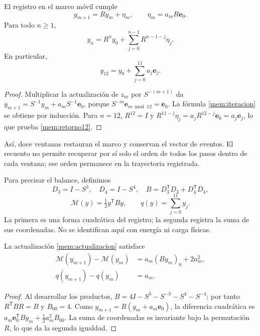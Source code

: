\begin{proposition}
\label{mem:prop-actualizacion}
El registro en el marco móvil cumple
\begin{equation}
 y_{m+1}=Ry_m+\eta_m,\qquad
 \eta_m=a_mR\mathbf e_0.
 \label{mem:actualizacion}
\end{equation}
Para todo \(n\geq1\),
\begin{equation}
 y_n=R^ny_0+\sum_{j=0}^{n-1}R^{n-1-j}\eta_j.
 \label{mem:iteracion}
\end{equation}
En particular,
\begin{equation}
 y_{12}=y_0+\sum_{j=0}^{11}a_j\mathbf e_j.
 \label{mem:retorno12}
\end{equation}
\end{proposition}
\begin{proof}
Multiplicar la actualización de \(z_m\) por \(S^{-(m+1)}\) da
\(y_{m+1}=S^{-1}y_m+a_mS^{-1}\mathbf e_0\), porque
\(S^{-m}\mathbf e_{m\bmod12}=\mathbf e_0\).
La fórmula \eqref{mem:iteracion} se obtiene por inducción.
Para \(n=12\), \(R^{12}=I\) y
\(R^{11-j}\eta_j=a_jR^{12-j}\mathbf e_0=a_j\mathbf e_j\),
lo que prueba \eqref{mem:retorno12}.
\end{proof}

Así, doce ventanas restauran el marco y conservan el vector de eventos.
El recuento no permite recuperar por sí solo el orden de todos los pasos
dentro de cada ventana; ese orden permanece en la trayectoria registrada.

Para precisar el balance, definimos
\[
 D_3=I-S^3,\quad D_4=I-S^4,\quad
 B=D_3^{\mathsf T}D_3+D_4^{\mathsf T}D_4,
\]
\[
 \mathcal M(y)=\tfrac12y^{\mathsf T}By,
 \qquad q(y)=\sum_{j=0}^{11}y_j.
\]
La primera es una forma cuadrática del registro; la segunda registra
la suma de sus coordenadas. No se identifican aquí con energía ni carga físicas.

\begin{proposition}
\label{mem:prop-balance}
La actualización \eqref{mem:actualizacion} satisface
\begin{equation}
 \begin{aligned}
 \mathcal M(y_{m+1})-\mathcal M(y_m)
   &=a_m(By_m)_0+2a_m^2,\\
 q(y_{m+1})-q(y_m)&=a_m.
 \end{aligned}
 \label{mem:balance}
\end{equation}
\end{proposition}
\begin{proof}
Al desarrollar los productos,
\(B=4I-S^3-S^{-3}-S^4-S^{-4}\); por tanto
\(R^{\mathsf T}BR=B\) y \(B_{00}=4\).
Como \(y_{m+1}=R(y_m+a_m\mathbf e_0)\), la diferencia cuadrática
es \(a_m\mathbf e_0^{\mathsf T}By_m+\tfrac12a_m^2B_{00}\).
La suma de coordenadas es invariante bajo la permutación \(R\),
lo que da la segunda igualdad.
\end{proof}

